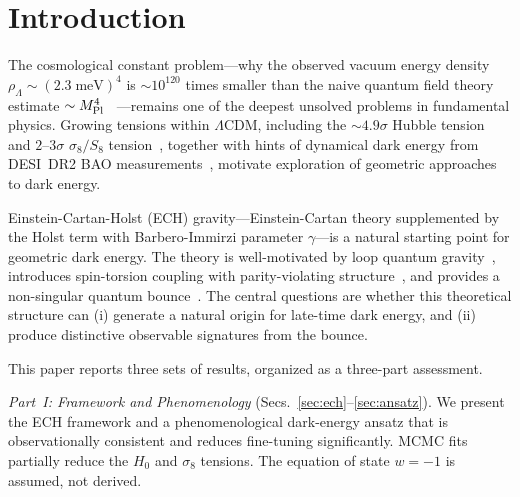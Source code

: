\documentclass[aps,prd,twocolumn,superscriptaddress,showpacs,preprintnumbers,
  nofootinbib,longbibliography,floatfix]{revtex4-2}
\newcommand{\MPl}{M_{\rm Pl}}
\newcommand{\BI}{\gamma}
\begin{document}

\maketitle
\tableofcontents


\section{Introduction}\label{sec:intro}

The cosmological constant problem---why the observed vacuum energy density
$\rho_\Lambda \sim (2.3\;\text{meV})^4$ is $\sim 10^{120}$ times smaller
than the naive quantum field theory estimate $\sim \MPl^4$~\cite{Weinberg1989}%
---remains one of the deepest unsolved problems in fundamental physics.
Growing tensions within $\Lambda$CDM, including the ${\sim}4.9\sigma$
Hubble tension~\cite{Riess2022,Planck2018params} and $2$--$3\sigma$
$\sigma_8/S_8$ tension~\cite{KiDS2021,DES2024}, together with hints of
dynamical dark energy from DESI~DR2 BAO
measurements~\cite{DESI2024,DESI2025DR2}, motivate exploration of
geometric approaches to dark energy.

Einstein-Cartan-Holst (ECH) gravity---Einstein-Cartan theory supplemented
by the Holst term with Barbero-Immirzi parameter $\BI$---is a natural
starting point for geometric dark energy. The theory is well-motivated by
loop quantum gravity~\cite{Ashtekar2011}, introduces spin-torsion coupling
with parity-violating structure~\cite{Freidel2005,Mercuri2006}, and
provides a non-singular quantum bounce~\cite{Poplawski2012}. The central
questions are whether this theoretical structure can (i) generate a natural
origin for late-time dark energy, and (ii) produce distinctive observable
signatures from the bounce.

This paper reports three sets of results, organized as a three-part
assessment.

\textit{Part~I: Framework and Phenomenology} (Secs.~\ref{sec:ech}--\ref{sec:ansatz}).
We present the ECH framework and a phenomenological dark-energy ansatz that
is observationally consistent and reduces fine-tuning significantly.
MCMC fits partially reduce the $H_0$ and $\sigma_8$ tensions. The equation
of state $w = -1$ is assumed, not derived.
\end{document}
